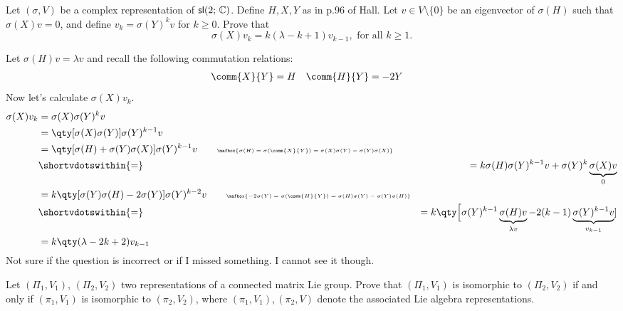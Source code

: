 \documentclass[
	pages,
	boxes,
	color=WildStrawberry
]{homework}
\begin{document}
\begin{problem}
Let $(\sigma, V)$ be a complex representation of $\mathsf{sl}(2;\, \mathbb{C})$. Define $H, X, Y$ as in p.96 of Hall. Let $v \in V \setminus \{0\}$ be an eigenvector of $\sigma(H)$ such that $\sigma(X) v = 0$, and define $v_{k} = \sigma(Y)^k v$ for $k \geq 0$. Prove that
\[
	\sigma(X)v_k = k(\lambda - k + 1)v_{k-1}, \text{ for all } k \geq 1.
\]
\end{problem}

\begin{solution}
	Let $\sigma(H)v = \lambda v$ and recall the following commutation relations:
	\begin{align*}
		\comm{X}{Y} & = H & \comm{H}{Y} & = -2Y
	\end{align*}
	Now let's calculate $\sigma(X)v_k$.
	\begin{align*}
		\sigma(X)v_k & = \sigma(X)\sigma(Y)^k v                                                                                                                                     \\
		             & = \qty[\sigma(X)\sigma(Y)]\sigma(Y)^{k-1}v                                                                                                                   \\
		             & = \qty[\sigma(H) + \sigma(Y)\sigma(X)]\sigma(Y)^{k-1}v \tag*{\tiny $\mafbox{\sigma(H) = \sigma(\comm{X}{Y}) = \sigma(X)\sigma(Y) - \sigma(Y)\sigma(X)}$}     \\
		             & \shortvdotswithin{=}
		             & = k\sigma(H)\sigma(Y)^{k-1}v + \sigma(Y)^k \underbrace{\sigma(X)v}_{0}                                                                                       \\
		             & = k\qty[\sigma(Y)\sigma(H) - 2\sigma(Y)]\sigma(Y)^{k-2}v \tag*{\tiny $\mafbox{-2\sigma(Y) = \sigma(\comm{H}{Y}) = \sigma(H)\sigma(Y) - \sigma(Y)\sigma(H)}$} \\
		             & \shortvdotswithin{=}
		             & = k\qty\Big[\sigma(Y)^{k-1}\underbrace{\sigma(H)v}_{\lambda v} - 2(k-1)\underbrace{\sigma(Y)^{k-1}v}_{v_{k-1}}]                                              \\
		             & = k\qty(\lambda - 2k + 2)v_{k-1}
	\end{align*}
	Not sure if the question is incorrect or if I missed something. I cannot see it though.
\end{solution}

\begin{problem}
Let $(\Pi_1, V_1)$, $(\Pi_2, V_2)$ two representations of a connected matrix Lie group. Prove that $(\Pi_1, V_1)$ is isomorphic to $(\Pi_2, V_2)$ if and only if $(\pi_1, V_1)$ is isomorphic to $(\pi_2, V_2)$, where $(\pi_1, V_1), (\pi_2, V)$ denote the associated Lie algebra representations.
\end{problem}
\end{document}
